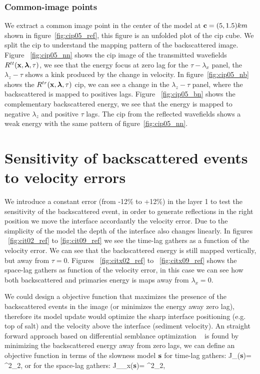 \subsubsection{Common-image points}

We extract a common image point in the center of the model at ${\bf c}=(5,1.5)km$ shown in figure~\ref{fig:cip05_ref}, this figure 
is an unfolded plot of the cip cube. We split the cip to understand the mapping pattern of the backscattered image. Figure
~\ref{fig:cip05_nn} shows the cip image of the transmitted wavefields $R^{tt}({\bf x},{\boldsymbol{\lambda}},\tau)$, we see that the energy focus at zero lag 
for the $\tau-\lambda_x$ panel, the $\lambda_z-\tau$ shows a kink produced by the change in velocity. In figure~\ref{fig:cip05_nb}
 shows the $R^{tr}({\bf x},{\boldsymbol{\lambda}},\tau)$ cip, we can see a change in the $\lambda_z-\tau$ panel, where the backscattered is mapped to positives lags. Figure
~\ref{fig:cip05_bn} shows the complementary backscattered energy, we see that the energy is mapped to negative $\lambda_z$ and positive $\tau$ lags.
The cip from the reflected wavefields shows a weak energy with the same pattern of figure~\ref{fig:cip05_nn}.

\section{Sensitivity of backscattered events to velocity errors}

We introduce a constant error (from -12\% to +12\%) in the layer 1 to test the sensitivity of the backscattered event, in order to generate
reflections in the right position we move the interface accordantly the velocity error. Due to the simplicity of the model the 
depth of the interface also changes linearly. In figures ~\ref{fig:cit02_ref} to \ref{fig:cit09_ref}
 we see the time-lag gathers as a function of the velocity error. We can see that the backscattered energy is still mapped vertically, but
away from $\tau=0$. Figures ~\ref{fig:citx02_ref} to ~\ref{fig:citx09_ref} shows the space-lag gathers as  function of the velocity error, 
in this case we can see how both backscattered and primaries energy is maps away from $\lambda_x=0$. 

We could design a objective function that maximizes the presence of the backscattered events in the image (or minimizes the energy away
zero lag), therefore its model update would optimize the sharp interface positioning (e.g. top of salt) and the velocity above the interface
 (sediment velocity). An straight forward approach based on differential semblance optimization ~\citep{shen:2132} is found by minimizing
 the backscattered energy away from zero lags, we can define an objective function in terms of the slowness model $\bf s$ for time-lag gathers:
\beq
 J_{\tau}({\bf s})=  ^2_2,
\label{eq:of1}
\eeq 
or for the space-lag gathers:
\beq
 J_{\lambda_x}({\bf s})=  ^2_2,
\label{eq:of2}
\eeq 

